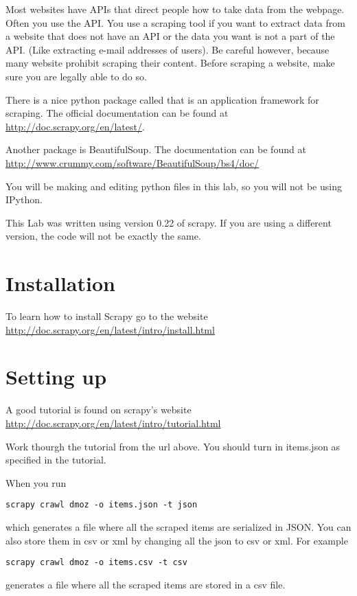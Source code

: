 Most websites have APIs that direct people how to take data from the webpage. 
Often you use the API. 
You use a scraping tool if you want to extract data from a website that does not have an API or the data you want is not a part of the API. 
(Like extracting e-mail addresses of users). 
Be careful however, because many website prohibit scraping their content.  Before scraping a website, make sure you are legally able to do so.

There is a nice python package called  that is an application framework for scraping.  
The official documentation can be found at \url{http://doc.scrapy.org/en/latest/}. 

Another package is BeautifulSoup.  
The documentation can be found at \url{http://www.crummy.com/software/BeautifulSoup/bs4/doc/}

\begin{info}
You will be making and editing python files in this lab, so you will not be using IPython.
\end{info}

\begin{warn}
This Lab was written using version 0.22 of scrapy.
If you are using a different version, the code will not be exactly the same.
\end{warn}

\section*{Installation}
To learn how to install Scrapy go to the website \url{http://doc.scrapy.org/en/latest/intro/install.html}

\section*{Setting up}
A good tutorial is found on scrapy's website
\url{http://doc.scrapy.org/en/latest/intro/tutorial.html}

\begin{problem}
Work thourgh the tutorial from the url above. You should turn in items.json as specified in the tutorial.
\end{problem}

When you run
\begin{lstlisting}
scrapy crawl dmoz -o items.json -t json
\end{lstlisting}
which generates a file  where all the scraped items are serialized in JSON.
You can also store them in csv or xml by changing all the json to csv or xml.
For example
\begin{lstlisting}
scrapy crawl dmoz -o items.csv -t csv
\end{lstlisting}
generates a file  where all the scraped items are stored in a csv file.

